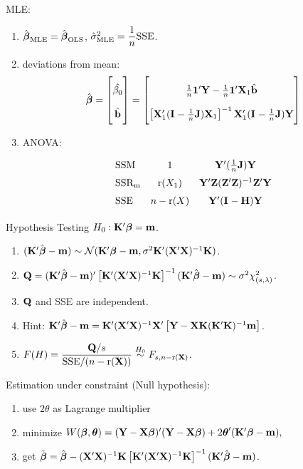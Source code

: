 MLE: \begin{enumerate}
    \item $\hat{\boldsymbol{\beta}}_{\text{MLE}} = \hat{\boldsymbol{\beta}}_{\text{OLS}}$, $\hat{\sigma}^2_{\text{MLE}} = \dfrac{1}{n}\text{SSE}$.
    \item deviations from mean: 
    $$
        \renewcommand\arraystretch{2}
        \hat{\bbeta} = \begin{bmatrix}
            \hat{\beta_0} \\
            \hat{\bb}
        \end{bmatrix}
        = \begin{bmatrix}
            \frac{1}{n} \bone{}'\bY - \frac{1}{n} \bone{}'\bX_1 \hat{\bb} \\
            \left[\bX_1' (\bI{} - \frac{1}{n}\bJ ) \bX_1\right]^{-1} \bX_1' (\bI{} - \frac{1}{n}\bJ ) \bY
        \end{bmatrix}
    $$
    \item ANOVA: $$
        \renewcommand\arraystretch{1.5}
        \begin{array}{lcc}
            \text{SSM} & 1
            & \bY' (\frac{1}{n} \bJ) \bY \\
            \text{SSR\textsubscript{m}} & \rk{X_1}
            & \bY' \bZ (\bZ' \bZ)^{-1} \bZ' \bY \\
            \text{SSE} & n - \rk{X}
            & \bY' (\bI{} - \bH) \bY 
        \end{array}
    $$
\end{enumerate}

\newpage 

Hypothesis Testing $H_0: \mathbf{K}'\boldsymbol{\beta} = \mathbf{m}$. \begin{enumerate}
    \item $(\mathbf{K}' \hat{\boldsymbol{\beta}} - \mathbf{m}) \sim \mathcal{N}(\mathbf{K}'\boldsymbol{\beta} - \mathbf{m}, \sigma^2 \mathbf{K}' (\mathbf{X}'\mathbf{X})^{-1} \mathbf{K})$.
    \item $\mathbf{Q} = (\mathbf{K}' \hat{\boldsymbol{\beta}} - \mathbf{m})' \left[ \mathbf{K}' (\mathbf{X}' \mathbf{X})^{-1} \mathbf{K} \right]^{-1} (\mathbf{K}' \hat{\boldsymbol{\beta}} - \mathbf{m}) \sim \sigma^2\chi^2_{(s, \lambda)}$.
    \item $\mathbf{Q}$ and SSE are independent.
    \item [] Hint: $\mathbf{K}'\hat{\boldsymbol{\beta}} - \mathbf{m} = \mathbf{K}'(\mathbf{X}'\mathbf{X})^{-1}\mathbf{X}' \left[ \mathbf{Y} - \mathbf{X} \mathbf{K} (\mathbf{K}' \mathbf{K})^{-1} \mathbf{m}\right] $.
    \item $F(H) = \dfrac{\mathbf{Q} / s}{\text{SSE} / (n - \text{r}(\mathbf{X}))} \stackrel{H_0}{\sim} F_{s, n-\text{r}(\mathbf{X})}$.
\end{enumerate}

Estimation under constraint (Null hypothesis): \begin{enumerate}
    \item use $2\theta$ as Lagrange multiplier
    \item minimize $
        W(\boldsymbol{\beta}, \boldsymbol{\theta}) = (\mathbf{Y} - \mathbf{X} \boldsymbol{\beta})' (\mathbf{Y} - \mathbf{X} \boldsymbol{\beta}) + 2 \boldsymbol{\theta}'(\mathbf{K}' \boldsymbol{\beta} - \mathbf{m}),
    $
    \item get $\tilde{\boldsymbol{\beta}} = \hat{\boldsymbol{\beta}} - (\mathbf{X}' \mathbf{X})^{-1} \mathbf{K} \left[\mathbf{K}' (\mathbf{X}'\mathbf{X})^{-1} \mathbf{K}\right]^{-1} (\mathbf{K}' \hat{\boldsymbol{\beta}} - \mathbf{m})$.
\end{enumerate}

